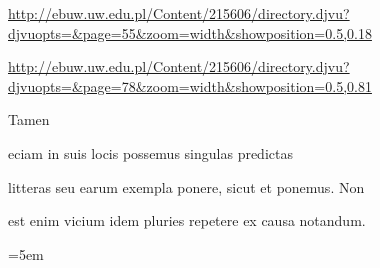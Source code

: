 
\newParkoszpage

{
\url{http://ebuw.uw.edu.pl/Content/215606/directory.djvu?djvuopts=&page=55&zoom=width&showposition=0.5,0.18}

\url{http://ebuw.uw.edu.pl/Content/215606/directory.djvu?djvuopts=&page=78&zoom=width&showposition=0.5,0.81}
}

\bigskip

\obeylines
\mono



\fullpreviouslines


{
\color{blue}

Tamen

eciam in suis locis possemus singulas predictas
}


\fulllines

litteras seu earum exempla ponere, sicut et ponemus. Non

est enim vicium idem pluries repetere ex causa notandum.



\def\splitverse{\advance\plineno by 1\psublineno=0\everypar{\advance\psublineno by 1\llap{\textcolor{green}{\the\ppageno-\ifnum\plineno<10 0\fi\the \plineno-\the\psublineno \ }}\hskip5em}}

\def\fullverselines{\everypar{\advance\plineno by 1\llap{\the\ppageno-\ifnum\plineno<10 0\fi\the \plineno \hskip 1.5em}\hskip5em}}


\def\newverse{\advance\plineno by 1\psublineno=0\hskip10em}
\def\newversesubline{\hskip\indentV}
\def\newverseline{\advance\plineno by 1\psublineno=0}
\newdimen\indentV
\newdimen\indentVt
\indentV=5em
\def\indentVerse{\hskip\indentV{}}
\def\indentVerseTotal{\hskip\indentVt{}}


